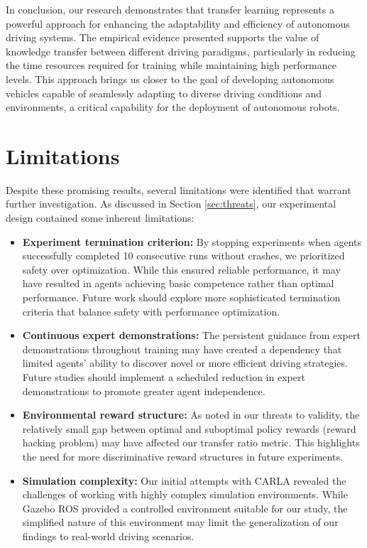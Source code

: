 In conclusion, our research demonstrates that transfer learning represents a powerful approach for enhancing the adaptability and efficiency of autonomous driving systems. The empirical evidence presented supports the value of knowledge transfer between different driving paradigms, particularly in reducing the time resources required for training while maintaining high performance levels. This approach brings us closer to the goal of developing autonomous vehicles capable of seamlessly adapting to diverse driving conditions and environments, a critical capability for the deployment of autonomous robots.

\section{Limitations}
Despite these promising results, several limitations were identified that warrant further investigation. As discussed in Section \ref{sec:threats}, our experimental design contained some inherent limitations:

\begin{itemize}
    \item \textbf{Experiment termination criterion:} By stopping experiments when agents successfully completed 10 consecutive runs without crashes, we prioritized safety over optimization. While this ensured reliable performance, it may have resulted in agents achieving basic competence rather than optimal performance. Future work should explore more sophisticated termination criteria that balance safety with performance optimization.

    \item \textbf{Continuous expert demonstrations:} The persistent guidance from expert demonstrations throughout training may have created a dependency that limited agents' ability to discover novel or more efficient driving strategies. Future studies should implement a scheduled reduction in expert demonstrations to promote greater agent independence.
    
    \item \textbf{Environmental reward structure:} As noted in our threats to validity, the relatively small gap between optimal and suboptimal policy rewards (reward hacking problem) may have affected our transfer ratio metric. This highlights the need for more discriminative reward structures in future experiments.
    
    \item \textbf{Simulation complexity:} Our initial attempts with CARLA revealed the challenges of working with highly complex simulation environments. While Gazebo ROS provided a controlled environment suitable for our study, the simplified nature of this environment may limit the generalization of our findings to real-world driving scenarios.
    
\end{itemize}

